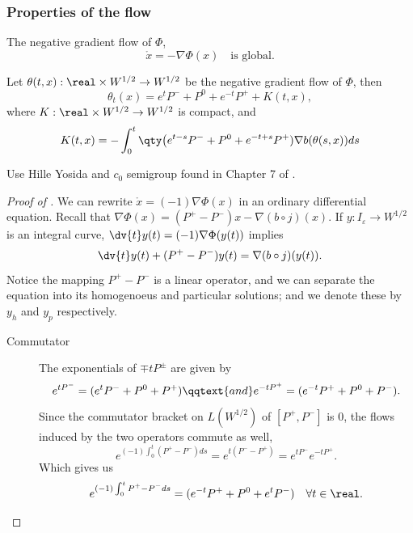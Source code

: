 \documentclass[../main-v2-manifolds.tex]{subfiles}
\begin{document}
\subsubsection*{Properties of the flow}
\begin{wts}
    The negative gradient flow of $\Phi$, 
    \[
        \mathring{x} = -\nabla \Phi(x) \quad\text{is global.}
    \]
\end{wts}
\begin{wts}\label{wts:almost compact flow}
    Let $\theta(t,x):\real\times W^{1/2}\to W^{1/2}$ be the negative gradient flow of $\Phi$, then
    \[
        \theta_t(x) = e^{t}P^- + P^0 + e^{-t}P^+ + K(t,x),
    \]
    where $K:\real\times W^{1/2}\to W^{1/2}$ is compact, and 
    \[
        K(t,x) = -\int_0^t \qty\big(e^{t-s}P^- + P^0 + e^{-t + s}P^+)\nabla b(\theta(s,x))ds
    \]
\end{wts}
\begin{note}
    Use Hille Yosida and $c_0$ semigroup found in Chapter 7 of \cite{Brezis2010Functional}.
\end{note}
\begin{proof}[Proof of ]
    We can rewrite $\mathring{x} = (-1)\nabla\Phi(x)$ in an ordinary differential equation. Recall that $\nabla\Phi(x) = (P^+ - P^-)x - \nabla (b\circ j)(x)$. If $y: I_\varepsilon\to W^{1/2}$ is an integral curve, $\dv{t}y(t) = (-1)\nabla\Phi(y(t))$ implies
    \[
    \dv{t}y(t) + (P^+ - P^-)y(t) = \nabla (b\circ j)(y(t) ).
    \]
    Notice the mapping $P^+ - P^-$ is a linear operator, and we can separate the equation into its homogenoeus and particular solutions; and we denote these by $y_h$ and $y_p$ respectively.
    \begin{description}
        \item[Commutator]
        The exponentials of $\mp tP^\pm$ are given by 
        \[
            e^{t P^-} = (e^t P^- + P^0 + P^+) \qqtext{and}e^{-t P^+} = (e^{-t} P^+ + P^0 + P^-).
        \]
        Since the commutator bracket on $L(W^{1/2})$ of $[P^+, P^-]$ is $0$, the flows induced by the two operators commute as well,
        \[
            e^{(-1)\int_0^t (P^+ - P^-)ds} = e^{t(P^- - P^+)} = e^{tP^-}e^{-tP^+}.
        \]
        Which gives us
        \[
            e^{(-1)\int_0^t P^+ - P^- ds} = (e^{-t}P^+ +P^0 + e^{t}P^-)\quad\forall t\in\real.
        \]
    \end{description}
\end{proof}
\end{document}

